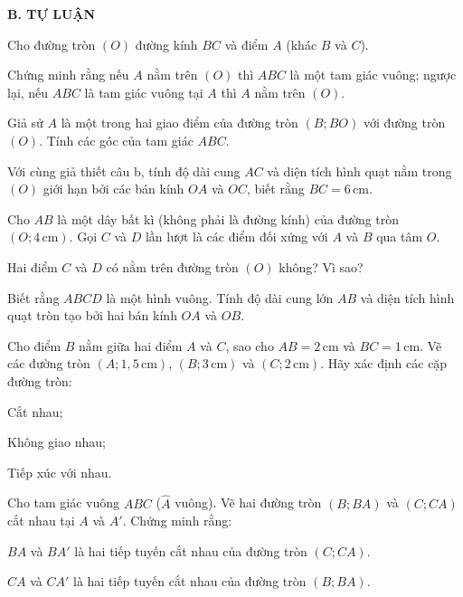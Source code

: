 \begin{exercises}
    \textbf{B. TỰ LUẬN}

    \begin{questions}[resume=SGK]
        \item Cho đường tròn $(O)$ đường kính $BC$ và điểm $A$ (khác $B$ và $C$).
        \begin{questions}
            \item Chứng minh rằng nếu $A$ nằm trên $(O)$ thì $ABC$ là một tam giác vuông; ngược lại, nếu $ABC$ là tam giác vuông tại $A$ thì $A$ nằm trên $(O)$.
            \item Giả sử $A$ là một trong hai giao điểm của đường tròn $(B; BO)$ với đường tròn $(O)$. Tính các góc của tam giác $ABC$.
            \item Với cùng giả thiết câu b, tính độ dài cung $AC$ và diện tích hình quạt nằm trong $(O)$ giới hạn bởi các bán kính $OA$ và $OC$, biết rằng $BC=6\,\mathrm{cm}$.
        \end{questions}
        \answerline
        \answerline
        \answerline

        \item Cho $AB$ là một dây bất kì (không phải là đường kính) của đường tròn $(O; 4\,\mathrm{cm})$. Gọi $C$ và $D$ lần lượt là các điểm đối xứng với $A$ và $B$ qua tâm $O$.
        \begin{questions}
            \item Hai điểm $C$ và $D$ có nằm trên đường tròn $(O)$ không? Vì sao?
            \item Biết rằng $ABCD$ là một hình vuông. Tính độ dài cung lớn $AB$ và diện tích hình quạt tròn tạo bởi hai bán kính $OA$ và $OB$.
        \end{questions}
        \answerline
        \answerline

        \item Cho điểm $B$ nằm giữa hai điểm $A$ và $C$, sao cho $AB=2\,\mathrm{cm}$ và $BC=1\,\mathrm{cm}$. Vẽ các đường tròn $(A; 1{,}5\,\mathrm{cm})$, $(B; 3\,\mathrm{cm})$ và $(C; 2\,\mathrm{cm})$. Hãy xác định các cặp đường tròn:
        \begin{questions}
            \item Cắt nhau;
            \item Không giao nhau;
            \item Tiếp xúc với nhau.
        \end{questions}
        \answerline
        \answerline

        \item Cho tam giác vuông $ABC$ ($\widehat A$ vuông). Vẽ hai đường tròn $(B; BA)$ và $(C; CA)$ cắt nhau tại $A$ và $A'$. Chứng minh rằng:
        \begin{questions}
            \item $BA$ và $BA'$ là hai tiếp tuyến cắt nhau của đường tròn $(C; CA)$.
            \item $CA$ và $CA'$ là hai tiếp tuyến cắt nhau của đường tròn $(B; BA)$.
        \end{questions}
        \answerline
        \answerline


\end{questions}
\end{exercises}

